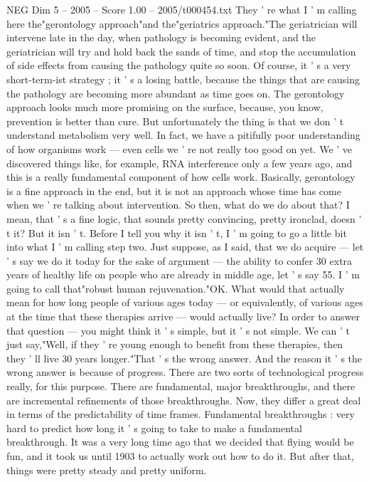 \begin{textsample}{NEG Dim 5 – 2005 – Score 1.00 – 2005/t000454.txt}
They ' re what I ' m calling here the"gerontology approach"and the"geriatrics approach."The geriatrician will intervene late in the day, when pathology is becoming evident, and the geriatrician will try and hold back the sands of time, and stop the accumulation of side effects from causing the pathology quite so soon.
Of course, it ' s a very short-term-ist strategy ; it ' s a losing battle, because the things that are causing the pathology are becoming more abundant as time goes on.
The gerontology approach looks much more promising on the surface, because, you know, prevention is better than cure.
But unfortunately the thing is that we don ' t understand metabolism very well.
In fact, we have a pitifully poor understanding of how organisms work — even cells we ' re not really too good on yet.
We ' ve discovered things like, for example, RNA interference only a few years ago, and this is a really fundamental component of how cells work.
Basically, gerontology is a fine approach in the end, but it is not an approach whose time has come when we ' re talking about intervention.
So then, what do we do about that?
I mean, that ' s a fine logic, that sounds pretty convincing, pretty ironclad, doesn ' t it?
But it isn ' t.
Before I tell you why it isn ' t, I ' m going to go a little bit into what I ' m calling step two.
Just suppose, as I said, that we do acquire — let ' s say we do it today for the sake of argument — the ability to confer 30 extra years of healthy life on people who are already in middle age, let ' s say 55.
I ' m going to call that"robust human rejuvenation."OK.
What would that actually mean for how long people of various ages today — or equivalently, of various ages at the time that these therapies arrive — would actually live?
In order to answer that question — you might think it ' s simple, but it ' s not simple.
We can ' t just say,"Well, if they ' re young enough to benefit from these therapies, then they ' ll live 30 years longer."That ' s the wrong answer.
And the reason it ' s the wrong answer is because of progress.
There are two sorts of technological progress really, for this purpose.
There are fundamental, major breakthroughs, and there are incremental refinements of those breakthroughs.
Now, they differ a great deal in terms of the predictability of time frames.
Fundamental breakthroughs : very hard to predict how long it ' s going to take to make a fundamental breakthrough.
It was a very long time ago that we decided that flying would be fun, and it took us until 1903 to actually work out how to do it.
But after that, things were pretty steady and pretty uniform.

\end{textsample}
